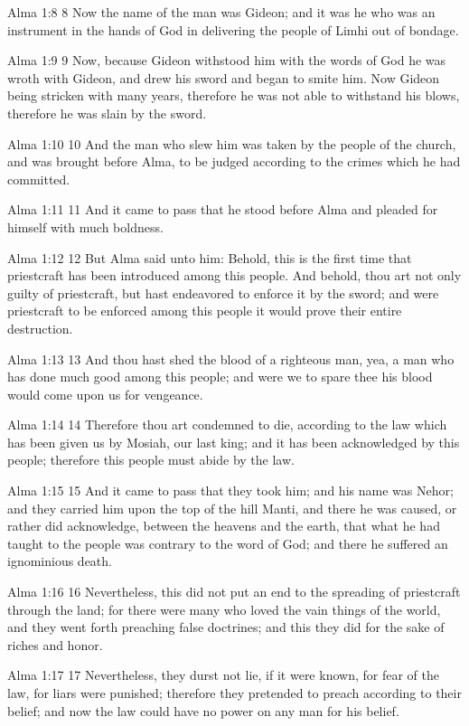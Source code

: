 Alma 1:8
 8 Now the name of the man was Gideon; and it was he who was an
instrument in the hands of God in delivering the people of Limhi
out of bondage.

Alma 1:9
 9 Now, because Gideon withstood him with the words of God he was
wroth with Gideon, and drew his sword and began to smite him.
Now Gideon being stricken with many years, therefore he was not
able to withstand his blows, therefore he was slain by the sword.

Alma 1:10
 10 And the man who slew him was taken by the people of the
church, and was brought before Alma, to be judged according to
the crimes which he had committed.

Alma 1:11
 11 And it came to pass that he stood before Alma and pleaded for
himself with much boldness.

Alma 1:12
 12 But Alma said unto him: Behold, this is the first time that
priestcraft has been introduced among this people. And behold,
thou art not only guilty of priestcraft, but hast endeavored to
enforce it by the sword; and were priestcraft to be enforced
among this people it would prove their entire destruction.

Alma 1:13
 13 And thou hast shed the blood of a righteous man, yea, a man
who has done much good among this people; and were we to spare
thee his blood would come upon us for vengeance.

Alma 1:14
 14 Therefore thou art condemned to die, according to the law
which has been given us by Mosiah, our last king; and it has been
acknowledged by this people; therefore this people must abide by
the law.

Alma 1:15
 15 And it came to pass that they took him; and his name was
Nehor; and they carried him upon the top of the hill Manti, and
there he was caused, or rather did acknowledge, between the
heavens and the earth, that what he had taught to the people was
contrary to the word of God; and there he suffered an ignominious
death.

Alma 1:16
 16 Nevertheless, this did not put an end to the spreading of
priestcraft through the land; for there were many who loved the
vain things of the world, and they went forth preaching false
doctrines; and this they did for the sake of riches and honor.

Alma 1:17
 17 Nevertheless, they durst not lie, if it were known, for fear
of the law, for liars were punished; therefore they pretended to
preach according to their belief; and now the law could have no
power on any man for his belief.

